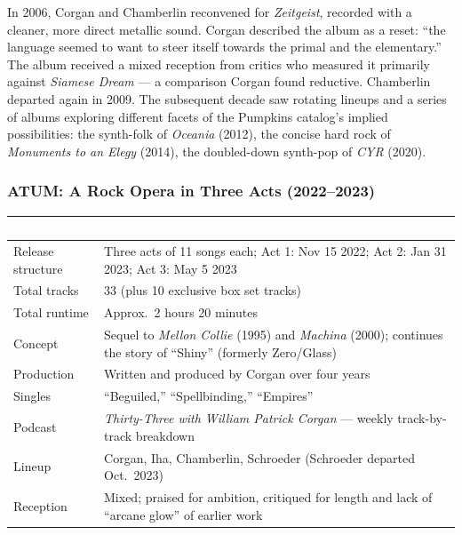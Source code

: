 \documentclass[11pt,letterpaper]{article}
\newcommand{\tableheader}[1]{\textbf{\sffamily\textcolor{white}{#1}}}
\begin{document}
In 2006, Corgan and Chamberlin reconvened for \textit{Zeitgeist}, recorded with a cleaner, more direct metallic sound. Corgan described the album as a reset: ``the language seemed to want to steer itself towards the primal and the elementary.'' The album received a mixed reception from critics who measured it primarily against \textit{Siamese Dream} --- a comparison Corgan found reductive. Chamberlin departed again in 2009. The subsequent decade saw rotating lineups and a series of albums exploring different facets of the Pumpkins catalog's implied possibilities: the synth-folk of \textit{Oceania} (2012), the concise hard rock of \textit{Monuments to an Elegy} (2014), the doubled-down synth-pop of \textit{CYR} (2020).

\subsubsection{ATUM: A Rock Opera in Three Acts (2022--2023)}

\begin{center}
\begin{tabularx}{\textwidth}{L{3.5cm}X}
\toprule
{}
\tableheader{Attribute} & \tableheader{Data} \\
\midrule
Release structure & Three acts of 11 songs each; Act 1: Nov 15 2022; Act 2: Jan 31 2023; Act 3: May 5 2023 \\
Total tracks & 33 (plus 10 exclusive box set tracks) \\
Total runtime & Approx.\ 2 hours 20 minutes \\
Concept & Sequel to \textit{Mellon Collie} (1995) and \textit{Machina} (2000); continues the story of ``Shiny'' (formerly Zero/Glass) \\
Production & Written and produced by Corgan over four years \\
Singles & ``Beguiled,'' ``Spellbinding,'' ``Empires'' \\
Podcast & \textit{Thirty-Three with William Patrick Corgan} --- weekly track-by-track breakdown \\
Lineup & Corgan, Iha, Chamberlin, Schroeder (Schroeder departed Oct.\ 2023) \\
Reception & Mixed; praised for ambition, critiqued for length and lack of ``arcane glow'' of earlier work \\
\bottomrule
\end{tabularx}
\end{center}
\end{document}
